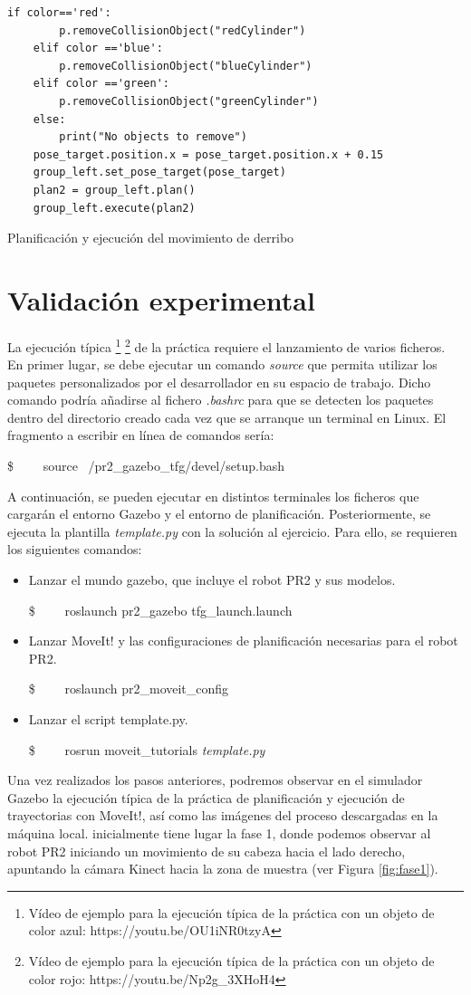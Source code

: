 \documentclass[12pt,spanish,chapterprefix, numbers=noenddot]{book}
\numberwithin{equation}{section}
\numberwithin{figure}{section}
\begin{document}
\begin{algorithm}[htb!]
    \begin{lstlisting}[frame=single] 
    if color=='red':
        p.removeCollisionObject("redCylinder")
    elif color =='blue':
        p.removeCollisionObject("blueCylinder")
    elif color =='green':
        p.removeCollisionObject("greenCylinder")
    else:
        print("No objects to remove")
    pose_target.position.x = pose_target.position.x + 0.15
    group_left.set_pose_target(pose_target)
    plan2 = group_left.plan()
    group_left.execute(plan2)
    \end{lstlisting}
\caption{\label{alg:derribo}Planificación y ejecución del movimiento de derribo}
\end{algorithm}

\section{Validación experimental}
La ejecución típica \footnote{Vídeo de ejemplo para la ejecución típica de la práctica con un objeto de color azul: https://youtu.be/OU1iNR0tzyA} \footnote{Vídeo de ejemplo para la ejecución típica de la práctica con un objeto de color rojo: https://youtu.be/Np2g\_3XHoH4} de la práctica requiere el lanzamiento de varios ficheros. En primer lugar, se debe ejecutar un comando \textit{source} que permita utilizar los paquetes personalizados por el desarrollador en su espacio de trabajo. Dicho comando podría añadirse al fichero \textit{.bashrc} para que se detecten los paquetes dentro del directorio creado cada vez que se arranque un terminal en Linux. El fragmento a escribir en línea de comandos sería: 

\$ \ \ \ \ source ~/pr2\_gazebo\_tfg/devel/setup.bash

A continuación, se pueden ejecutar en distintos terminales los ficheros que cargarán el entorno Gazebo y el entorno de planificación. Posteriormente, se ejecuta la plantilla \textit{template.py} con la solución al ejercicio. Para ello, se requieren los siguientes comandos: 
\begin{itemize}
    \item Lanzar el mundo gazebo, que incluye el robot PR2 y sus modelos.
    
    \$ \ \ \ \ roslaunch pr2\_gazebo tfg\_launch.launch
    \item Lanzar MoveIt! y las configuraciones de planificación necesarias para el robot PR2.
    
    \$ \ \ \ \ roslaunch pr2\_moveit\_config 
    \item Lanzar el script template.py.
    
    \$ \ \ \ \ rosrun moveit\_tutorials \textit{template.py}
\end{itemize}
Una vez realizados los pasos anteriores, podremos observar en el simulador Gazebo la ejecución típica de la práctica de planificación y ejecución de trayectorias con MoveIt!, así como las imágenes del proceso descargadas en la máquina local. 
inicialmente tiene lugar la fase 1, donde podemos observar al robot PR2 iniciando un movimiento de su cabeza hacia el lado derecho, apuntando la cámara Kinect hacia la zona de muestra (ver Figura \ref{fig:fase1}).
\end{document}
